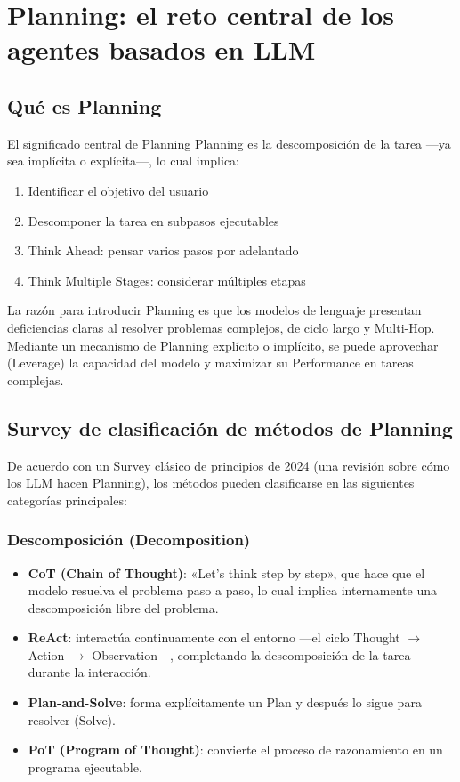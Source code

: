 \section{Planning: el reto central de los agentes basados en LLM}

\subsection{Qué es Planning}

\begin{importantbox}{El significado central de Planning}
Planning es la descomposición de la tarea —ya sea implícita o explícita—, lo cual implica:
\begin{enumerate}
    \item Identificar el objetivo del usuario
    \item Descomponer la tarea en subpasos ejecutables
    \item Think Ahead: pensar varios pasos por adelantado
    \item Think Multiple Stages: considerar múltiples etapas
\end{enumerate}
\end{importantbox}

La razón para introducir Planning es que los modelos de lenguaje presentan deficiencias claras al resolver problemas complejos, de ciclo largo y Multi-Hop. Mediante un mecanismo de Planning explícito o implícito, se puede aprovechar (Leverage) la capacidad del modelo y maximizar su Performance en tareas complejas.

\subsection{Survey de clasificación de métodos de Planning}

De acuerdo con un Survey clásico de principios de 2024 (una revisión sobre cómo los LLM hacen Planning), los métodos pueden clasificarse en las siguientes categorías principales:

\subsubsection{Descomposición (Decomposition)}

\begin{itemize}
    \item \textbf{CoT (Chain of Thought)}: «Let's think step by step», que hace que el modelo resuelva el problema paso a paso, lo cual implica internamente una descomposición libre del problema.
    \item \textbf{ReAct}: interactúa continuamente con el entorno —el ciclo Thought $\rightarrow$ Action $\rightarrow$ Observation—, completando la descomposición de la tarea durante la interacción.
    \item \textbf{Plan-and-Solve}: forma explícitamente un Plan y después lo sigue para resolver (Solve).
    \item \textbf{PoT (Program of Thought)}: convierte el proceso de razonamiento en un programa ejecutable.
\end{itemize}

